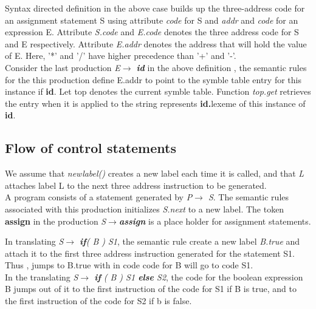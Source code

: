 \documentclass[12pt, oneside, a4paper]{article}
\begin{document}
Syntax directed definition in the above case builds up the three-address code for an assignment statement S using attribute \emph{code} for S and \emph{addr} and \emph{code} for an expression E. Attribute \emph{S.code} and \emph{E.code} denotes the three address code for S and E respectively. Attribute \emph{E.addr} denotes the address that will hold the value of E.  Here, '*' and '/' have higher precedence than '+' and '-'.\\

Consider the last production \emph{E$\rightarrow$ \textbf{id}} in the above definition , the semantic rules for the this production define E.addr to point to the symble table entry for this instance if \textbf{id}. Let top denotes the current symble table. Function \emph{top.get} retrieves the entry when it is applied to the string represents \textbf{id.}lexeme of this instance of \textbf{id}.\\

\subsection{Flow of control statements}
We assume that \emph{newlabel()} creates a new label each time it is called, and that \emph{L} attaches label L to the next three address instruction to be generated.\\

A program consists of a statement generated by \emph{P$\rightarrow$ S}. The semantic rules associated with this production initializes \emph{S.next} to a new label. The token \textbf{assign} in the production \emph{S$\rightarrow$\textbf{assign}} is a place holder for assignment statements.

In translating \emph{S$\rightarrow$ \textbf{if}( B ) S1}, the semantic rule create a new label \emph{B.true} and attach it to the first three address instruction generated for the statement S1. Thus , jumps to B.true with in code code for B will go to code S1.\\

In the translating \emph{S$\rightarrow$ \textbf{if} ( B ) S1 \textbf{else} S2}, the code for the boolean expression B jumps out of it to the first instruction of the code for S1 if B is true, and to the first instruction of the code for S2 if b is false.
\end{document}

